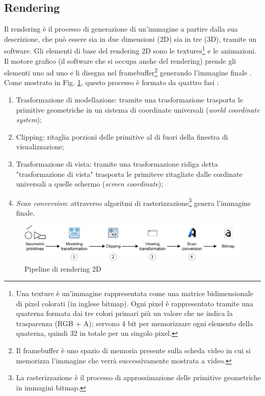 \subsection{Rendering}
Il rendering è il processo di generazione di un'immagine a partire dalla sua descrizione, che può essere sia in due dimensioni (2D) sia in tre (3D), tramite un software. Gli elementi di base del rendering 2D sono le textures\footnote{Una texture è un'immagine rappresentata come una matrice bidimensionale di pixel colorati (in inglese bitmap). Ogni pixel è rappresentato tramite una quaterna formata dai tre colori primari più un valore che ne indica la trasparenza (RGB + A); servono 4 bit per memorizzare ogni elemento della quaterna, quindi 32 in totale per un singolo pixel.} e le animazioni. Il motore grafico (il software che si occupa anche del rendering) prende gli elementi uno ad uno e li disegna nel framebuffer\footnote{Il framebuffer è uno spazio di memoria presente sulla scheda video in cui si memorizza l'immagine che verrà successivamente mostrata a video.} generando l'immagine finale \parencite{Efficient_2D_software_rendering}. Come mostrato in Fig. \ref{fig:rendering_pipeline}, questo processo è formato da quattro fasi \parencite{Computer_Vision_A_Modern_Approach}:

\begin{enumerate}
    \item Trasformazione di modellazione: tramite una trasformazione trasporta le primitive geometriche in un sistema di coordinate universali (\textit{world coordinate system});
    \item Clipping: ritaglia porzioni delle primitive al di fuori della finestra di visualizzazione;
    \item Trasformazione di vista: tramite una trasformazione ridiga detta "trasformazione di vista" trasporta le primiteve ritagliate dalle cordinate universali a quelle schermo (\textit{screen coordinate});
    \item \textit{Scan conversion}: attraverso algoritmi di rasterizzazione\footnote{La rasterizzazione è il processo di approssimazione delle primitive geometriche in immagini bitmap.} genera l'immagine finale.
\end{enumerate}

\begin{figure}[H]
	\includegraphics[width=\linewidth]{immagini/rendering_pipeline}
	\caption{Pipeline di rendering 2D}
	\label{fig:rendering_pipeline}
\end{figure}

